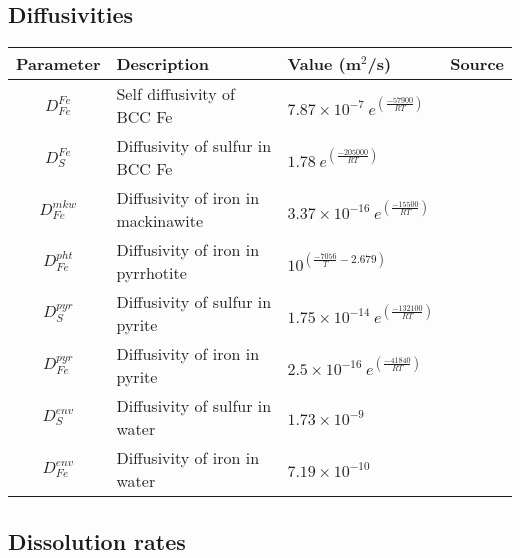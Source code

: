 \documentclass{article}
\begin{document}
\subsection{Diffusivities}


\begin{center}
    \begin{tabular}{ | c | p{5cm} | p{5cm} | c |}
    \hline
    Parameter & Description & Value (m$^2$/s) & Source \\
    \hline
    $D_{Fe}^{Fe}$ & Self diffusivity of BCC Fe & $7.87 \times 10^{-7} \  e^{\left(\frac{-57900}{R T}\right)}$ & \cite{MDBFMM09} \\
    \hline
    $D_{S}^{Fe}$ & Diffusivity of sulfur in BCC Fe & $ 1.78 \ e^{\left(\frac{-205000}{R T}\right)}$ & \cite{DOCACF82} \\

    \hline
    $D_{Fe}^{mkw}$ & Diffusivity of iron in mackinawite & $ 3.37 \times 10^{-16} \ e^{\left(\frac{-15500}{R T}\right)}$ & \cite{SOCCJA11} \\

    \hline
    $D_{Fe}^{pht}$ & Diffusivity of iron in pyrrhotite & $ 10^{\left(\frac{-7056}{T} - 2.679 \right)}$ & \cite{MDPFFH15} \\

    \hline
    $D_{S}^{pyr}$ & Diffusivity of sulfur in pyrite & $ 1.75 \times 10^{-14} \ e^{\left(\frac{-132100}{R T}\right)}$ & \cite{ROOSEW09} \\

    \hline
    $D_{Fe}^{pyr}$ & Diffusivity of iron in pyrite & $ 2.5 \times 10^{-16} \ e^{\left(\frac{-41840}{R T}\right)}$ & \cite{CSAPJC75} \\

    \hline
    $D_{S}^{env}$ & Diffusivity of sulfur in water & $ 1.73 \times 10^{-9}$ & \cite{DC3KAT94} \\

    \hline
    $D_{Fe}^{env}$ & Diffusivity of iron in water & $ 7.19 \times 10^{-10}$ & \cite{MOPMJD02} \\

    \hline

    \end{tabular}
\end{center}



\subsection{Dissolution rates}
\end{document}
